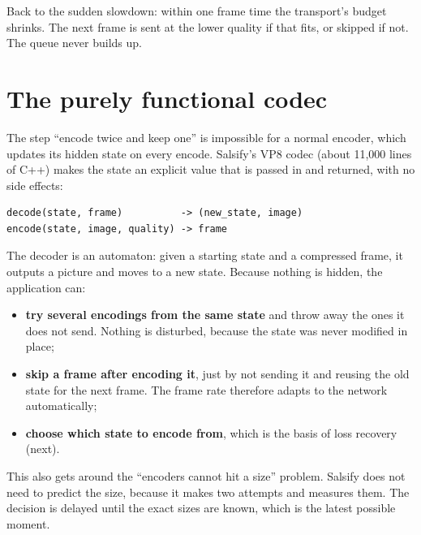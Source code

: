 Back to the sudden slowdown: within one frame time the transport's budget shrinks. The next frame is sent at the lower quality if that fits,
or skipped if not. The queue never builds up.

\section{The purely functional codec}

The step ``encode twice and keep one'' is impossible for a normal encoder, which updates its hidden state on every encode. Salsify's VP8 codec
(about 11,000 lines of C++) makes the state an explicit value that is passed in and returned, with no side effects:
\begin{lstlisting}
decode(state, frame)          -> (new_state, image)
encode(state, image, quality) -> frame
\end{lstlisting}
The decoder is an automaton: given a starting state and a compressed frame, it outputs a picture and moves to a new state. Because nothing is hidden,
the application can:
\begin{itemize}
  \item \textbf{try several encodings from the same state} and throw away the ones it does not send. Nothing is disturbed, because the state was never
        modified in place;
  \item \textbf{skip a frame after encoding it}, just by not sending it and reusing the old state for the next frame. The frame rate therefore adapts to the
        network automatically;
  \item \textbf{choose which state to encode from}, which is the basis of loss recovery (next).
\end{itemize}
This also gets around the ``encoders cannot hit a size'' problem. Salsify does not need to predict the size, because it makes two attempts and
measures them. The decision is delayed until the exact sizes are known, which is the latest possible moment.

